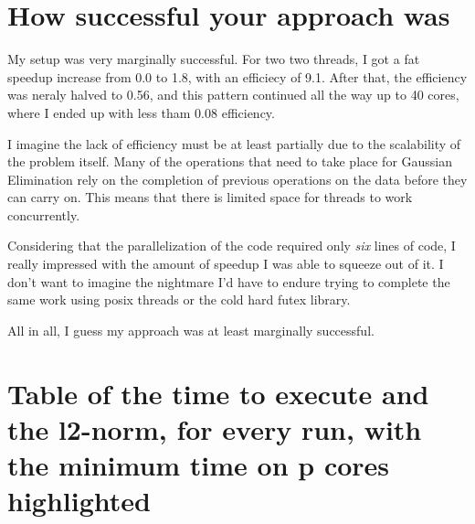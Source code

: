 \documentclass[a4paper,12pt]{article}
\begin{document}
\section{How successful your approach was}
        
        My setup was very marginally successful. For two two threads, I got a
        fat speedup increase from 0.0 to 1.8, with an efficiecy of 9.1. After
        that, the efficiency was neraly halved to 0.56, and this pattern
        continued all the way up to 40 cores, where I ended up with less tham
        0.08 efficiency.

        I imagine the lack of efficiency must be at least partially due to the
        scalability of the problem itself. Many of the operations that need to
        take place for Gaussian Elimination rely on the completion of previous
        operations on the data before they can carry on. This means that there
        is limited space for threads to work concurrently.

        Considering that the parallelization of the code required only \emph{six}
        lines of code, I really impressed with the amount of speedup I was able
        to squeeze out of it. I don't want to imagine the nightmare I'd have to
        endure trying to complete the same work using posix threads or the cold
        hard futex library.

        All in all, I guess my approach was at least marginally successful.


\section{Table of the time to execute and the l2-norm, for every run, with the
   minimum time on p cores highlighted}
\end{document}
